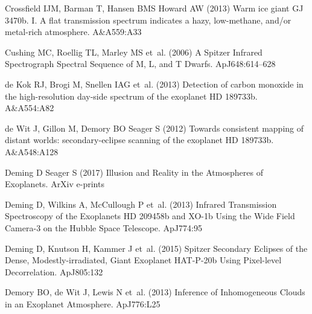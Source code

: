 \documentclass[graybox,natbib,nosecnum]{svmult}
\newcommand*\aap{A\&A}
\newcommand*\apj{ApJ}
\newcommand*\apjl{ApJ}
\begin{document}
\begin{thebibliography}{110}
{Crossfield} IJM, {Barman} T, {Hansen} BMS {Howard} AW (2013) {Warm ice giant
  GJ 3470b. I. A flat transmission spectrum indicates a hazy, low-methane,
  and/or metal-rich atmosphere}. \aap 559:A33

{Cushing} MC, {Roellig} TL, {Marley} MS et~al. (2006) {A Spitzer Infrared
  Spectrograph Spectral Sequence of M, L, and T Dwarfs}. \apj 648:614--628

{de Kok} RJ, {Brogi} M, {Snellen} IAG et~al. (2013) {Detection of carbon
  monoxide in the high-resolution day-side spectrum of the exoplanet HD
  189733b}. \aap 554:A82

{de Wit} J, {Gillon} M, {Demory} BO {Seager} S (2012) {Towards consistent
  mapping of distant worlds: secondary-eclipse scanning of the exoplanet HD
  189733b}. \aap 548:A128

{Deming} D {Seager} S (2017) {Illusion and Reality in the Atmospheres of
  Exoplanets}. ArXiv e-prints

{Deming} D, {Wilkins} A, {McCullough} P et~al. (2013) {Infrared Transmission
  Spectroscopy of the Exoplanets HD 209458b and XO-1b Using the Wide Field
  Camera-3 on the Hubble Space Telescope}. \apj 774:95

{Deming} D, {Knutson} H, {Kammer} J et~al. (2015) {Spitzer Secondary Eclipses
  of the Dense, Modestly-irradiated, Giant Exoplanet HAT-P-20b Using
  Pixel-level Decorrelation}. \apj 805:132

{Demory} BO, {de Wit} J, {Lewis} N et~al. (2013) {Inference of Inhomogeneous
  Clouds in an Exoplanet Atmosphere}. \apjl 776:L25


\end{thebibliography}
\end{document}
